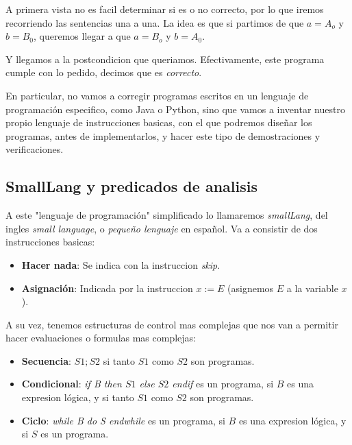 \documentclass{article}
\begin{document}

A primera vista no es facil determinar si es o no correcto, por lo que iremos recorriendo las sentencias una a una. La idea es que si partimos de que $a = A_{o}$ y $b = B_{0}$, queremos llegar a que $a = B_{o}$ y $b = A_{0}$.


Y llegamos a la postcondicion que queriamos. Efectivamente, este programa cumple con lo pedido, decimos que es \textit{correcto}.

En particular, no vamos a corregir programas escritos en un lenguaje de programación especifico, como Java o Python, sino que vamos a inventar nuestro propio lenguaje de instrucciones basicas, con el que podremos diseñar los programas, antes de implementarlos, y hacer este tipo de demostraciones y verificaciones.

\subsection{SmallLang y predicados de analisis}

A este "lenguaje de programación" simplificado lo llamaremos \textit{smallLang}, del ingles \textit{small language}, o \textit{pequeño lenguaje} en español. Va a consistir de dos instrucciones basicas:

\begin{itemize}
	\item[] \textbf{Hacer nada}: Se indica con la instruccion \textit{skip}.
	
	\item[] \textbf{Asignación}: Indicada por la instruccion $x := E$ (asignemos $E$ a la variable $x$).
\end{itemize}

A su vez, tenemos estructuras de control mas complejas que nos van a permitir hacer evaluaciones o formulas mas complejas:

\begin{itemize}
	\item[] \textbf{Secuencia}: $S1; S2$ si tanto $S1$ como $S2$ son programas.
	
	\item[] \textbf{Condicional}: \textit{if B then $S1$ else $S2$ endif} es un programa, si $B$ es una expresion lógica, y si tanto $S1$ como $S2$ son programas.
	
	\item[] \textbf{Ciclo}: \textit{while B do S endwhile} es un programa, si $B$ es una expresion lógica, y si $S$ es un programa.
\end{itemize}
\end{document}
